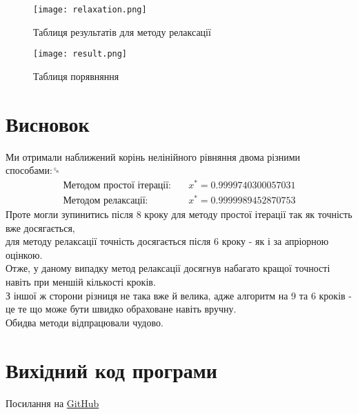 \documentclass[a4paper, 12pt]{article}
\begin{document}
\begin{figure}[h]
	\centering
	\texttt{[image: relaxation.png]}
	\caption{Таблиця результатів для методу релаксації}
\end{figure}

\begin{figure}[h]
	\centering
	\texttt{[image: result.png]}
	\caption{Таблиця порявняння}
\end{figure}


\newpage
\section{Висновок}
Ми отримали наближений корінь нелінійного рівняння двома різними способами:␍ \\
\begin{align*}
	\text{Методом простої ітерації:} & \quad x^* = 0.9999740300057031 \\
	\text{Методом релаксації:}       & \quad x^* = 0.9999989452870753
\end{align*}
Проте могли зупинитись після 8 кроку для методу простої ітерації так як точність вже досягається, \\
для методу релаксації точність досягається після 6 кроку - як і за апріорною оцінкою. \\

Отже, у даному випадку метод релаксації досягнув набагато кращої точності навіть при меншій кількості кроків. \\
З іншої ж сторони різниця не така вже й велика, адже алгоритм на 9 та 6 кроків - це те що може бути швидко обраховане навіть вручну. \\
Обидва методи відпрацювали чудово.

\newpage
\section{Вихідний код програми}
Посилання на \href{https://github.com/ngnsr/nt_lab1}{GitHub}
\end{document}
